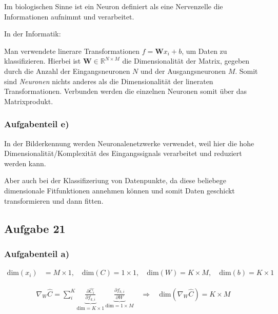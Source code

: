 \documentclass[11pt]{article}
\begin{document}
Im biologischen Sinne ist ein Neuron definiert als eine Nervenzelle die
Informationen aufnimmt und verarbeitet.

In der Informatik:

Man verwendete linerare Transformationen \(f=\mathbf{W}x_i + b\), um
Daten zu klassifizieren. Hierbei ist
\(\mathbf{W}\in \mathbb{R}^{N\times M}\) die Dimensionalität der Matrix,
gegeben durch die Anzahl der Eingangsneuronen \(N\) und der
Ausgangsneuronen \(M\). Somit sind \emph{Neuronen} nichts anderes als
die Dimensionalität der lineraten Transformationen. Verbunden werden die
einzelnen Neuronen somit über das Matrixprodukt.

\hypertarget{aufgabenteil-e}{%
\subsubsection{Aufgabenteil e)}\label{aufgabenteil-e}}

In der Bilderkennung werden Neuronalenetzwerke verwendet, weil hier die
hohe Dimensionalität/Komplexität des Eingangssignals verarbeitet und
reduziert werden kann.

Aber auch bei der Klassifizeriung von Datenpunkte, da diese beliebege
dimensionale Fitfunktionen annehmen können und somit Daten geschickt
transformieren und dann fitten.

    \hypertarget{aufgabe-21}{%
\subsection{Aufgabe 21}\label{aufgabe-21}}

    \hypertarget{aufgabenteil-a}{%
\subsubsection{Aufgabenteil a)}\label{aufgabenteil-a}}

\[ \begin{aligned}
\mathrm{dim}(x_i) &= M\times 1, \quad \mathrm{dim}(C) = 1 \times 1, \quad \mathrm{dim}(W) = K \times M,  \quad \mathrm{dim}(b) = K \times 1
\end{aligned}\]

\[\begin{aligned}
\nabla_W \hat{C} = \sum_i^K \underbrace{\frac{\partial\hat{C_i}}{\partial f_{k,i}}}_{\mathrm{dim} = K\times 1}\,\underbrace{\frac{\partial f_{k,i}}{\partial W}}_{{\mathrm{dim} = 1\times M}} \quad \Rightarrow \quad \mathrm{dim}(\nabla_W \hat{C}) = K \times M
\end{aligned}\]
\end{document}

